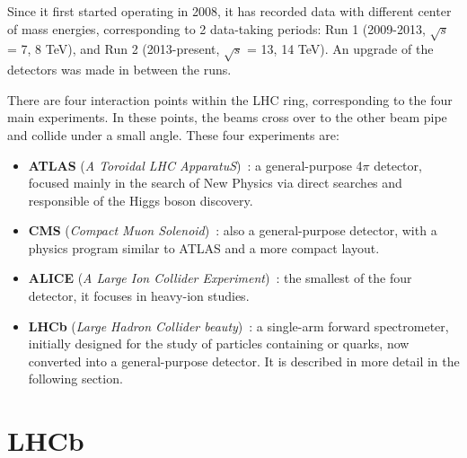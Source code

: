 Since it first started operating in 2008, it has recorded data with different center of mass energies, corresponding to 2 data-taking periods: Run 1 (2009-2013,  $\sqrt{s}$ = 7, 8 TeV), and Run 2 (2013-present, $\sqrt{s}$ = 13, 14 TeV). An upgrade of the detectors was made in between the runs. 

There are four interaction points within the LHC ring, corresponding to the four main experiments. In these points, the beams cross over to the other beam pipe and collide under a small angle. These four experiments are: 

\begin{itemize}
\item \textbf{ATLAS} (\textit{A Toroidal LHC ApparatuS})~\cite{Armstrong:1994it}: a general-purpose 4$\pi$ detector, focused mainly in the search of New Physics via direct searches and responsible of the Higgs boson discovery.
\item \textbf{CMS} (\textit{Compact Muon Solenoid})~\cite{CMS:1994hea}: also a general-purpose detector, with a physics program similar to ATLAS and a more compact layout. 
\item \textbf{ALICE} (\textit{A Large Ion Collider Experiment})~\cite{Alice}: the smallest of the four detector, it focuses in heavy-ion studies. 
\item \textbf{LHCb} (\textit{Large Hadron Collider beauty})~\cite{Amato:1998xt}: a single-arm forward spectrometer, initially designed for the study of particles containing \bquark or \cquark quarks, now converted into a general-purpose detector. It is described in more detail in the following section. 
\end{itemize}


\section{LHCb}
\label{sec:LHCb}


